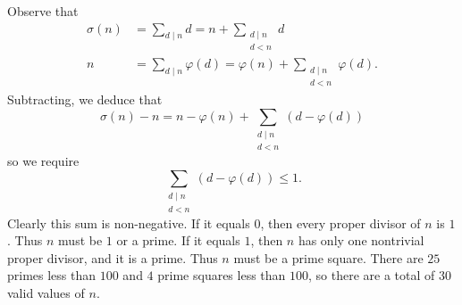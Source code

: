 Observe that
	\begin{align*}
		\sigma(n) &= \sum_{d\mid n}d = n+\sum_{\substack{d\mid n \\ d<n}}d \\
		n &= \sum_{d\mid n}\varphi(d) = \varphi(n)+\sum_{\substack{d\mid n \\ d<n}}\varphi(d).
	\end{align*}
	Subtracting, we deduce that
	\[
		\sigma(n)-n = n-\varphi(n)+\sum_{\substack{d\mid n \\ d<n}}(d-\varphi(d))
	\]
	so we require
	\[
		\sum_{\substack{d\mid n \\ d<n}}(d-\varphi(d))\leq1.
	\]
	Clearly this sum is non-negative. If it equals $0$, then every proper divisor of $n$ is $1$. Thus $n$ must be $1$ or a prime. If it equals $1$, then $n$ has only one nontrivial proper divisor, and it is a prime. Thus $n$ must be a prime square. There are $25$ primes less than $100$ and $4$ prime squares less than $100$, so there are a total of $30$ valid values of $n$.
	